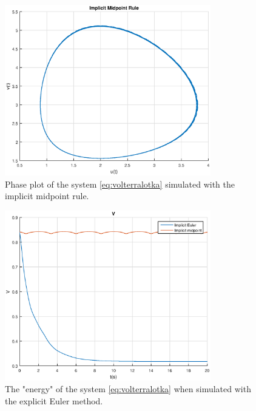 \documentclass{article}
\begin{document}
\begin{figure}[H]
    \centering
    \includegraphics[width = 0.8\textwidth]{modsim_ex6_1d_imr}
    \caption{Phase plot of the system \ref{eq:volterralotka} simulated with the implicit midpoint rule.}
    \label{fig:1d_imr}
\end{figure}

\begin{figure}[H]
    \centering
    \includegraphics[width = 0.8\textwidth]{modsim_ex6_1d_v}
    \caption{The "energy" of the system \ref{eq:volterralotka} when simulated with the explicit Euler method.}
    \label{fig:1d_vee}
\end{figure}
\end{document}
